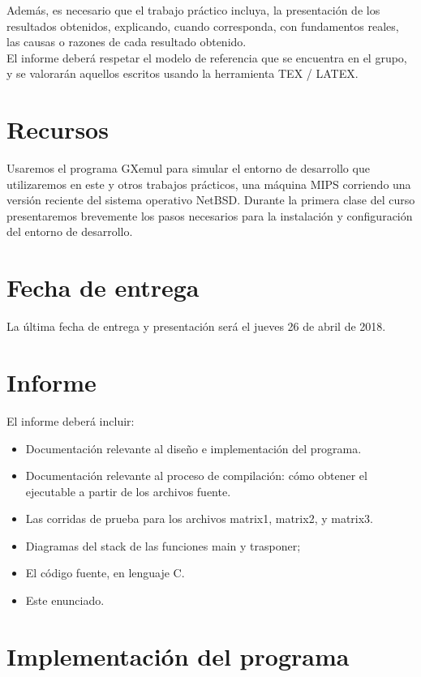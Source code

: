 \documentclass[11pt,a4paper]{article}
\begin{document}
Adem\'as, es necesario que el trabajo pr\'actico incluya, la presentaci\'on de los resultados obtenidos, explicando, cuando corresponda, con fundamentos reales, las causas o razones de cada resultado obtenido.\\

El informe deber\'a respetar el modelo de referencia que se encuentra en el grupo, y se valorar\'an aquellos escritos usando la herramienta TEX / LATEX.

\section{Recursos}

Usaremos el programa GXemul para simular el entorno de desarrollo que utilizaremos en este y otros trabajos prácticos, una máquina MIPS corriendo una versión reciente del sistema operativo NetBSD.
Durante la primera clase del curso presentaremos brevemente los pasos necesarios para la
instalación y configuración del entorno de desarrollo.
\\
\section{Fecha de entrega}

La última fecha de entrega y presentación ser\'a el jueves 26 de abril de 2018.
\\
\section{Informe}\label{informe}
El informe deberá incluir:
\begin{itemize}
\item Documentación relevante al diseño e implementación del programa.
\item Documentación relevante al proceso de compilación: cómo obtener el ejecutable a partir de los archivos fuente.
\item Las corridas de prueba para los archivos matrix1, matrix2, y matrix3.
\item Diagramas del stack de las funciones main y trasponer;
\item El código fuente, en lenguaje C.
\item Este enunciado.
\end{itemize}


\section{Implementaci\'on del programa}
\end{document}
